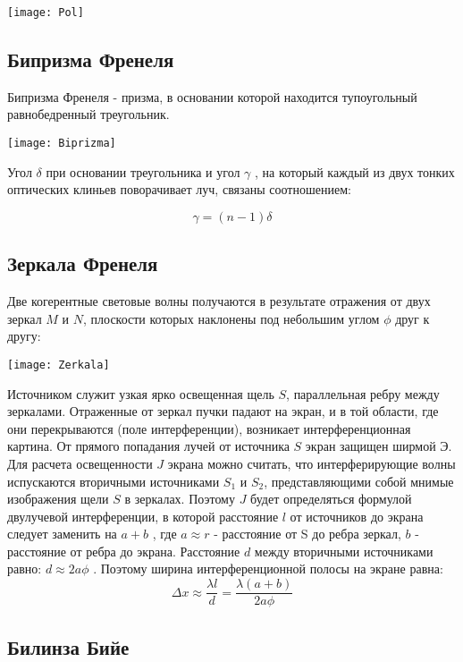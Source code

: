 \begin{center}
\texttt{[image: Pol]}
\end{center}

\subsection{Бипризма Френеля}

Бипризма Френеля - призма, в основании которой находится тупоугольный равнобедренный треугольник.

\begin{center}
\texttt{[image: Biprizma]}
\end{center}

Угол $\delta$ при основании треугольника и угол $\gamma$ , на который каждый из двух тонких оптических клиньев поворачивает луч, связаны соотношением:

$$\gamma = (n-1) \delta$$

\subsection{Зеркала Френеля}

Две когерентные световые волны получаются в результате отражения от двух зеркал $M$ и $N$, плоскости которых наклонены под небольшим углом $\phi$ друг к другу:
\begin{center}
\texttt{[image: Zerkala]}
\end{center}
Источником служит узкая ярко освещенная щель $S$, параллельная ребру между зеркалами. Отраженные от зеркал пучки падают на экран, и в той области, где они перекрываются (поле интерференции), возникает интерференционная картина. От прямого попадания лучей от источника $S$ экран защищен ширмой Э. Для расчета освещенности $J$ экрана можно считать, что интерферирующие волны испускаются вторичными источниками $S_1$   и  $S_2$, представляющими собой мнимые изображения щели $S$ в зеркалах. Поэтому $J$ будет определяться формулой двулучевой интерференции, в которой расстояние $l$ от источников до экрана следует заменить на  $a+b$ , где  $a \approx r$ - расстояние от S до ребра зеркал, $b$ - расстояние от ребра до экрана. Расстояние $d$ между вторичными источниками равно: $d \approx 2 a \phi$ . Поэтому ширина интерференционной полосы на экране равна:
$$ \Delta x \approx \frac{\lambda l}{d} = \frac{\lambda(a+b)}{2a \phi}$$

\subsection{Билинза Бийе}

